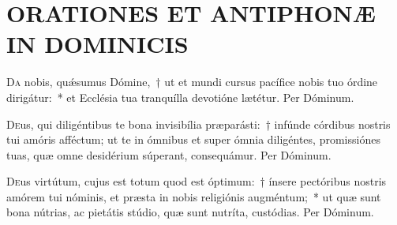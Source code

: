 \documentclass[vesperale_romanum.tex]{subfiles}
\begin{document}

\section*{ORATIONES ET ANTIPHONÆ IN DOMINICIS}

\subtitle{per ordinem dispositæ a quarta post Pentecosten usque ad Adventum.}





\oratio

\lettrine{D}{a} nobis, quǽsumus Dómine,~† ut et mundi cursus pacífice nobis tuo órdine dirigátur:~* et Ecclésia tua tranquílla devotióne lætétur. Per Dóminum.



\oratio

\lettrine{D}{e}us, qui diligéntibus te bona invisibília præparásti:~† infúnde córdibus nostris tui amóris affé\-ctum; ut te in ómnibus et super ómnia diligéntes, promissiónes tuas, quæ omne desidérium súperant, consequámur. Per Dóminum.



\oratio

\lettrine{D}{e}us virtútum, cujus est totum quod est óptimum:~† ínsere pectóribus nostris amórem tui nóminis, et præsta in nobis religiónis augméntum;~* ut quæ sunt bona nútrias, ac pietátis stúdio, quæ sunt nutríta, custódias.
Per Dóminum.


\end{document}
